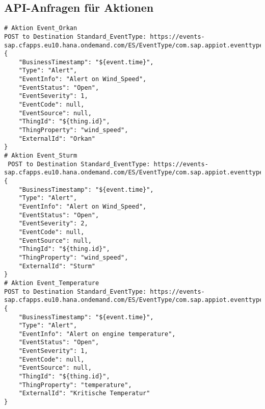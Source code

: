 \clearpage
\subsection{API-Anfragen für Aktionen}

\begin{lstlisting}
# Aktion Event_Orkan
POST to Destination Standard_EventType: https://events-sap.cfapps.eu10.hana.ondemand.com/ES/EventType/com.sap.appiot.eventtypes:StandardEventType/v1/Events
{
	"BusinessTimestamp": "${event.time}",
	"Type": "Alert",
	"EventInfo": "Alert on Wind_Speed",
	"EventStatus": "Open",
	"EventSeverity": 1,
	"EventCode": null,
	"EventSource": null,
	"ThingId": "${thing.id}",
	"ThingProperty": "wind_speed",
	"ExternalId": "Orkan"
}
# Aktion Event_Sturm
 POST to Destination Standard_EventType: https://events-sap.cfapps.eu10.hana.ondemand.com/ES/EventType/com.sap.appiot.eventtypes:StandardEventType/v1/Events
{
	"BusinessTimestamp": "${event.time}",
	"Type": "Alert",
	"EventInfo": "Alert on Wind_Speed",
	"EventStatus": "Open",
	"EventSeverity": 2,
	"EventCode": null,
	"EventSource": null,
	"ThingId": "${thing.id}",
	"ThingProperty": "wind_speed",
	"ExternalId": "Sturm"
}
# Aktion Event_Temperature
POST to Destination Standard_EventType: https://events-sap.cfapps.eu10.hana.ondemand.com/ES/EventType/com.sap.appiot.eventtypes:StandardEventType/v1/Events
{
	"BusinessTimestamp": "${event.time}",
	"Type": "Alert",
	"EventInfo": "Alert on engine temperature",
	"EventStatus": "Open",
	"EventSeverity": 1,
	"EventCode": null,
	"EventSource": null,
	"ThingId": "${thing.id}",
	"ThingProperty": "temperature",
	"ExternalId": "Kritische Temperatur"
}
\end{lstlisting}


